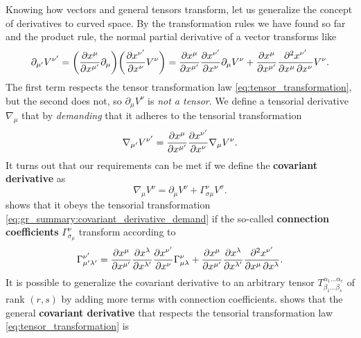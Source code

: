 Knowing how vectors and general tensors transform, let us generalize the concept of derivatives to curved space.
By the transformation rules we have found so far and the product rule, the normal partial derivative of a vector transforms like
\begin{equation}
	\partial_{\mu'} V^{\nu'} = \bigg( \pdv{x^{\mu}}{x^{\mu'}} \partial_\mu \bigg) \bigg( \pdv{x^{\nu'}}{x^{\nu}} V^\nu \bigg)
	                         = \pdv{x^{\mu}}{x^{\mu'}} \pdv{x^{\nu'}}{x^{\nu}} \partial_\mu V^\nu + \pdv{x^{\mu}}{x^{\mu'}} \pdv{x^{\nu'}}{x^\mu, x^\nu} V^\nu .
\end{equation}
The first term respects the tensor transformation law \eqref{eq:tensor_transformation}, but the second does not, so $\partial_\mu V^\nu$ is \emph{not a tensor}.
We define a tensorial derivative $\nabla_\mu$ that by \emph{demanding} that it adheres to the tensorial transformation
\begin{equation}
	\nabla_{\mu'} V^{\nu'} = \pdv{x^{\mu}}{x^{\mu'}} \pdv{x^{\nu'}}{x^{\nu}} \nabla_\mu V^\nu .
\label{eq:gr_summary:covariant_derivative_demand}
\end{equation}
It turns out that our requirements can be met if we define the \textbf{covariant derivative} as
\begin{equation}
	\nabla_\mu V^\nu = \partial_\mu V^\nu + \Gamma_{\sigma \mu}^\nu V^\sigma .
\end{equation}
\cite[equation 3.6-3.10]{ref:carroll} shows that it obeys the tensorial transformation \eqref{eq:gr_summary:covariant_derivative_demand} if the so-called \textbf{connection coefficients} $\Gamma_{\sigma _\mu}^\nu$ transform according to
\begin{equation}
	\Gamma^{\nu'}_{\mu' \lambda'} = \pdv{x^{\mu}}{x^{\mu'}} \pdv{x^{\lambda}}{x^{\lambda'}} \pdv{x^{\nu'}}{x^{\nu}}  \Gamma^{\nu}_{\mu \lambda} + \pdv{x^{\mu}}{x^{\mu'}} \pdv{x^{\lambda}}{x^{\lambda'}} \pdv{x^{\nu'}}{x^\mu, x^\lambda} .
	\label{eq:connection_transformation}
\end{equation}
It is possible to generalize the covariant derivative to an arbitrary tensor $T^{\alpha_1 \ldots \alpha_r}_{\beta_1 \ldots \beta_s}$ of rank $(r,s)$ by adding more terms with connection coefficients.
\cite[equation 3.11-3.16]{ref:carroll} shows that the general \textbf{covariant derivative} that respects the tensorial transformation law \eqref{eq:tensor_transformation} is
